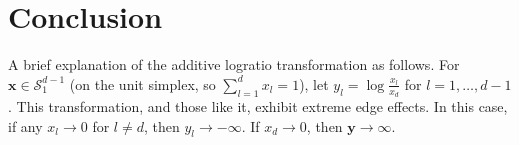 
\section{Conclusion}



A brief explanation of the additive logratio transformation
as follows.  For $\bm{x}\in \mathcal{S}_{1}^{d-1}$ (on the unit simplex, so $\sum_{l = 1}^d x_l = 1$),
let $y_l = \log\frac{x_l}{x_d}$ for $l = 1,\ldots,d-1$. This transformation, and those like it,
exhibit extreme edge effects.  In this case, if any $x_l\to0$ for $l \neq d$, then $y_l\to-\infty$.
If $x_d \to 0$, then $\bm{y}\to\infty$.



